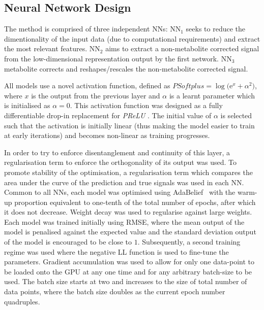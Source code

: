         \subsection{Neural Network Design} \label{sec:a_bayesian_neural_network-based_method_for_the_extraction_of_a_metabolite_corrected_arterial_input_function_from_dynamic_pbr28_pet_appendix_methods_neural_network_design}
            The method is comprised of three independent \glspl{NN}: \gls{NN}$_1$ seeks to reduce the dimentionality of the input data (due to computational requirements) and extract the most relevant features. \gls{NN}$_2$ aims to extract a non-metabolite corrected signal from the low-dimensional representation output by the first network. \gls{NN}$_3$ metabolite corrects and reshapes/rescales the non-metabolite corrected signal. 
        
            All models use a novel activation function, defined as $PSoftplus = \log\big(\mathrm{e}^{x} + \alpha^2 \big)$, where $x$ is the output from the previous layer and $\alpha$ is a learnt parameter which is initialised as $\alpha = 0$.  This activation function was designed as a fully differentiable drop-in replacement for \textit{PReLU} \cite{Ciuparu2020Soft++Architectures}. The initial value of $\alpha$ is selected such that the activation is initially linear (thus making the model easier to train at early iterations) and becomes non-linear as training progresses.
    
            In order to try to enforce disentanglement and continuity of this layer, a regularisation term to enforce the orthogonality of its output was used. To promote stability of the optimisation, a regularisation term which compares the area under the curve of the prediction and true signals was used in each \gls{NN}. Common to all \glspl{NN}, each model was optimised using AdaBelief~\cite{Zhuang2020AdaBeliefGradients} with the warm-up proportion equivalent to one-tenth of the total number of epochs, after which it does not decrease. Weight decay was used to regularise against large weights. Each model was trained initially using \gls{RMSE}, where the mean output of the model is penalised against the expected value and the standard deviation output of the model is encouraged to be close to $1$. Subsequently, a second training regime was used where the negative \gls{LL} function is used to fine-tune the parameters. Gradient accumulation was used to allow for only one data-point to be loaded onto the \gls{GPU} at any one time and for any arbitrary batch-size to be used. The batch size starts at two and increases to the size of total number of data points, where the batch size doubles as the current epoch number quadruples.

